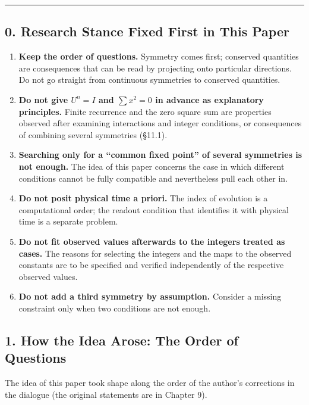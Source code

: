 \documentclass[
  a4paper,
]{article}
\providecommand{\tightlist}{%
  \setlength{\itemsep}{0pt}\setlength{\parskip}{0pt}}
\begin{document}
\begin{center}\rule{0.5\linewidth}{0.5pt}\end{center}

\subsection{0. Research Stance Fixed First in This
Paper}\label{research-stance-fixed-first-in-this-paper}

\begin{enumerate}
\def\labelenumi{\arabic{enumi}.}
\tightlist
\item
  \textbf{Keep the order of questions.} Symmetry comes first; conserved
  quantities are consequences that can be read by projecting onto
  particular directions. Do not go straight from continuous symmetries
  to conserved quantities.
\item
  \textbf{Do not give \(U^n=I\) and \(\sum x^2=0\) in advance as
  explanatory principles.} Finite recurrence and the zero square sum are
  properties observed after examining interactions and integer
  conditions, or consequences of combining several symmetries (§11.1).
\item
  \textbf{Searching only for a ``common fixed point'' of several
  symmetries is not enough.} The idea of this paper concerns the case in
  which different conditions cannot be fully compatible and nevertheless
  pull each other in.
\item
  \textbf{Do not posit physical time a priori.} The index of evolution
  is a computational order; the readout condition that identifies it
  with physical time is a separate problem.
\item
  \textbf{Do not fit observed values afterwards to the integers treated
  as cases.} The reasons for selecting the integers and the maps to the
  observed constants are to be specified and verified independently of
  the respective observed values.
\item
  \textbf{Do not add a third symmetry by assumption.} Consider a missing
  constraint only when two conditions are not enough.
\end{enumerate}

\subsection{1. How the Idea Arose: The Order of
Questions}\label{how-the-idea-arose-the-order-of-questions}

The idea of this paper took shape along the order of the author's
corrections in the dialogue (the original statements are in Chapter 9).
\end{document}
